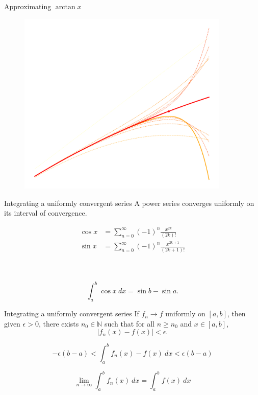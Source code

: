 \documentclass{beamer}
\def\N{\mathbb{N}}
\begin{document}
    \begin{frame}{Approximating $\arctan{x}$}
        \begin{figure}
            \centering
            \includegraphics[width=0.9\textwidth]{./img/arctan.png}
            \label{fig:arctan}
        \end{figure}
    \end{frame}

    \begin{frame}{Integrating a uniformly convergent series}
        A power series converges uniformly on its interval of convergence.

        \begin{align*}
            \cos{x} &= \sum_{n = 0}^\infty (-1)^n \frac{x^{2k}}{(2k)!} \\
            \sin{x} &= \sum_{n = 0}^\infty (-1)^n \frac{x^{2k + 1}}{(2k + 1)!}
        \end{align*}

        \\~\\

        \[
            \int_a^b \cos{x}\:dx = \sin{b} - \sin{a}.
        \] 
    \end{frame}
    
    \begin{frame}{Integrating a uniformly convergent series}
        If $f_n \to f$ uniformly on $[a, b]$, then given $\epsilon > 0$, there exists
        $n_0 \in \N$ such that for all $n \geq n_0$ and $x \in [a, b]$, \[
            |f_n(x) - f(x)| < \epsilon.
        \]

        \[
            -\epsilon(b - a) < \int_a^b f_n(x) - f(x) \:dx < \epsilon(b - a)
        \] 

        \[
            \lim_{n \to \infty} \int_a^b f_n(x)\:dx = \int_a^b f(x)\:dx
        \] 
    \end{frame}
    
\end{document}
